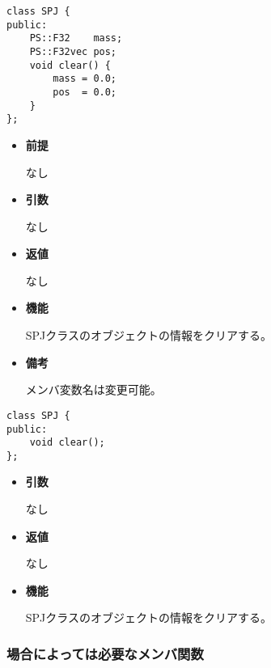 
\begin{screen}
\begin{verbatim}
class SPJ {
public:
    PS::F32    mass;
    PS::F32vec pos;
    void clear() {
        mass = 0.0;
        pos  = 0.0;
    }
};
\end{verbatim}
\end{screen}

\begin{itemize}

\item {\bf 前提}

  なし
  
\item {\bf 引数}

  なし

\item {\bf 返値}

  なし
  
\item {\bf 機能}

  SPJクラスのオブジェクトの情報をクリアする。

\item {\bf 備考}

  メンバ変数名は変更可能。

\end{itemize}
\fi

\begin{screen}
\begin{verbatim}
class SPJ {
public:
    void clear();
};
\end{verbatim}
\end{screen}

\begin{itemize}

\item {\bf 引数}

  なし

\item {\bf 返値}

  なし
  
\item {\bf 機能}

  SPJクラスのオブジェクトの情報をクリアする。

\end{itemize}


\subsubsection{場合によっては必要なメンバ関数}

